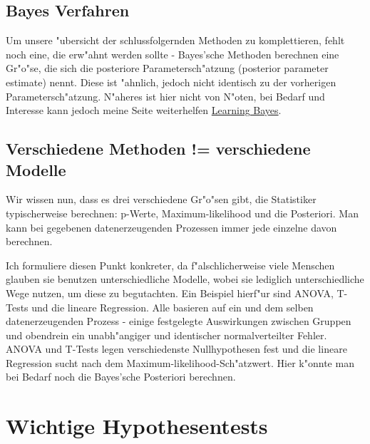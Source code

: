 \documentclass[a4paper,twoside]{tufte-book}\usepackage[]{graphicx}\usepackage[]{color}
\begin{document}
\subsection{Bayes Verfahren}

Um unsere "ubersicht der schlussfolgernden Methoden zu komplettieren, fehlt noch eine, die erw"ahnt werden sollte - Bayes'sche Methoden berechnen eine Gr"o"se, die sich die posteriore Parametersch"atzung (posterior parameter estimate) nennt. Diese ist "ahnlich, jedoch nicht identisch zu der vorherigen Parametersch"atzung. N"aheres ist hier nicht von N"oten, bei Bedarf und Interesse kann jedoch meine Seite weiterhelfen \citep{Gelman-BayesianDataAnalysis-2003} \href{http://florianhartig.github.io/LearningBayes/}{Learning Bayes}.

\subsection{Verschiedene Methoden != verschiedene Modelle}

Wir wissen nun, dass es drei verschiedene Gr"o"sen gibt, die Statistiker typischerweise berechnen: p-Werte, Maximum-likelihood und die Posteriori. Man kann bei gegebenen datenerzeugenden Prozessen immer jede einzelne davon berechnen.

Ich formuliere diesen Punkt konkreter, da f"alschlicherweise viele Menschen glauben sie benutzen unterschiedliche Modelle, wobei sie lediglich unterschiedliche Wege nutzen, um diese zu begutachten. Ein Beispiel hierf"ur sind ANOVA, T-Tests und die lineare Regression. Alle basieren auf ein und dem selben datenerzeugenden Prozess - einige festgelegte Auswirkungen zwischen Gruppen und obendrein ein unabh"angiger und identischer normalverteilter Fehler. ANOVA und T-Tests legen verschiedenste Nullhypothesen fest und die lineare Regression sucht nach dem Maximum-likelihood-Sch"atzwert. Hier k"onnte man bei Bedarf noch die Bayes'sche Posteriori berechnen. 

\section{Wichtige Hypothesentests}
\end{document}
